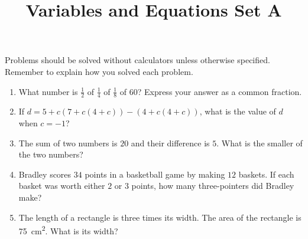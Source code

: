 \documentclass{article}
\title{Variables and Equations Set A}
\author{}
\date{}
\begin{document}
    \maketitle
    \noindent Problems should be solved without calculators unless otherwise specified. Remember to explain how you solved each problem.
    \begin{enumerate}
        \item What number is $\frac{1}{2}$ of $\frac{1}{4}$ of $\frac{1}{8}$ of $60$? Express your answer as a common fraction.
        \vspace{3cm}
        \item If $d = 5 + c(7 + c(4 + c)) - (4 + c(4 + c))$, what is the value of $d$ when $c = -1$?
        \vspace{3cm}
        \item The sum of two numbers is $20$ and their difference is $5$. What is the smaller of the two numbers?
        \vspace{3cm}
        \item Bradley scores $34$ points in a basketball game by making $12$ baskets. If each basket was worth either $2$ or $3$ points, how many three-pointers did Bradley make?
        \vspace{3cm}
        \item The length of a rectangle is three times its width. The area of the rectangle is \SI{75}{\cm\squared}. What is its width?
        \vspace{3cm}
    \end{enumerate}
\end{document}
